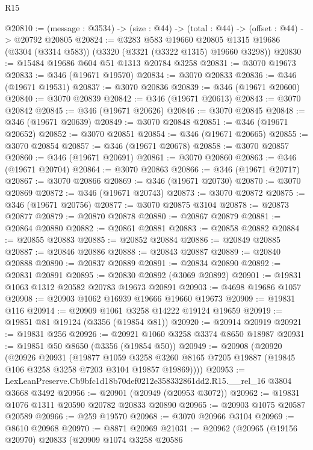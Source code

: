 \begin{lexlean}{R15}
\begin{coremodule}
@20810 := (message : @3534) -> (size : @44) -> (total : @44) -> (offset : @44) -> @20792 @20805
@20824 := @3283
    @583
    @19660
    @20805
    @1315
    @19686
    (@3304 (@3314 @583))
    (@3320 (@3321 (@3322 @1315) @19660 @3298))
@20830 := @15484 @19686 @604 @51 @1313 @20784 @3258
@20831 := @3070 @19673
@20833 := @346 (@19671 @19570)
@20834 := @3070 @20833
@20836 := @346 (@19671 @19531)
@20837 := @3070 @20836
@20839 := @346 (@19671 @20600)
@20840 := @3070 @20839
@20842 := @346 (@19671 @20613)
@20843 := @3070 @20842
@20845 := @346 (@19671 @20626)
@20846 := @3070 @20845
@20848 := @346 (@19671 @20639)
@20849 := @3070 @20848
@20851 := @346 (@19671 @20652)
@20852 := @3070 @20851
@20854 := @346 (@19671 @20665)
@20855 := @3070 @20854
@20857 := @346 (@19671 @20678)
@20858 := @3070 @20857
@20860 := @346 (@19671 @20691)
@20861 := @3070 @20860
@20863 := @346 (@19671 @20704)
@20864 := @3070 @20863
@20866 := @346 (@19671 @20717)
@20867 := @3070 @20866
@20869 := @346 (@19671 @20730)
@20870 := @3070 @20869
@20872 := @346 (@19671 @20743)
@20873 := @3070 @20872
@20875 := @346 (@19671 @20756)
@20877 := @3070 @20875 @3104
@20878 := @20873 @20877
@20879 := @20870 @20878
@20880 := @20867 @20879
@20881 := @20864 @20880
@20882 := @20861 @20881
@20883 := @20858 @20882
@20884 := @20855 @20883
@20885 := @20852 @20884
@20886 := @20849 @20885
@20887 := @20846 @20886
@20888 := @20843 @20887
@20889 := @20840 @20888
@20890 := @20837 @20889
@20891 := @20834 @20890
@20892 := @20831 @20891
@20895 := @20830 @20892 (@3069 @20892)
@20901 := @19831 @1063 @1312 @20582 @20783 @19673 @20891
@20903 := @4698 @19686 @1057
@20908 := @20903 @1062 @16939 @19666 @19660 @19673
@20909 := @19831 @116
@20914 := @20909 @1061 @3258 @14222 @19124 @19659
@20919 := @19851 @81 @19124 (@3356 (@19854 @81))
@20920 := @20914 @20919
@20921 := @19831 @256
@20926 := @20921 @1060 @3258 @3374 @8650 @18987
@20931 := @19851 @50 @8650 (@3356 (@19854 @50))
@20949 := @20908
    (@20920
      (@20926
        @20931
        (@19877
          @1059
          @3258
          @3260
          @8165
          @7205
          @19887
          (@19845 @106 @3258 @3258 @7203 @3104 @19857 @19869))))
@20953 := LexLeanPreserve.Cb9bfc1d18b70def0212e358332861dd2.R15.__rel_16 @3804 @3668 @3492
@20956 := @20901 (@20949 (@20953 @3072))
@20962 := @19831 @1076 @1311 @20590 @20782 @20833 @20890
@20965 := @20903 @1075 @20587 @20589
@20966 := @259 @19570
@20968 := @3070 @20966 @3104
@20969 := @8610 @20968
@20970 := @8871 @20969
@21031 := @20962
    (@20965
      (@19156 @20970)
      @20833
      (@20909
        @1074
        @3258
        @20586

\end{coremodule}
\end{lexlean}
